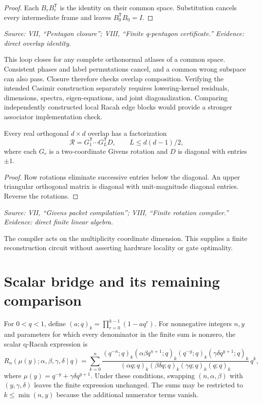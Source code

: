 \begin{proof}
Each $B_rB_r^{\mathsf T}$ is the identity on their common space. Substitution cancels every intermediate frame and leaves $B_0^{\mathsf T}B_0=I$.
\end{proof}

\noindent\emph{Source: VII, ``Pentagon closure''; VIII, ``Finite q-pentagon certificate.'' Evidence: direct overlap identity.}

This loop closes for any complete orthonormal atlases of a common space. Consistent phases and label permutations cancel, and a common wrong subspace can also pass. Closure therefore checks overlap composition. Verifying the intended Casimir construction separately requires lowering-kernel residuals, dimensions, spectra, eigen-equations, and joint diagonalization. Comparing independently constructed local Racah edge blocks would provide a stronger associator implementation check.

\begin{theorem}
Every real orthogonal $d\times d$ overlap has a factorization
\[
\mathcal R=G_1^{\mathsf T}\cdots G_L^{\mathsf T}D,
\qquad L\leq d(d-1)/2,
\]
where each $G_r$ is a two-coordinate Givens rotation and $D$ is diagonal with entries $\pm1$.
\end{theorem}

\begin{proof}
Row rotations eliminate successive entries below the diagonal. An upper triangular orthogonal matrix is diagonal with unit-magnitude diagonal entries. Reverse the rotations.
\end{proof}

\noindent\emph{Source: VII, ``Givens packet compilation''; VIII, ``Finite rotation compiler.'' Evidence: direct finite linear algebra.}

The compiler acts on the multiplicity coordinate dimension. This supplies a finite reconstruction circuit without asserting hardware locality or gate optimality.

\section{Scalar bridge and its remaining comparison}

For $0<q<1$, define $(a;q)_k=\prod_{r=0}^{k-1}(1-aq^r)$. For nonnegative integers $n,y$ and parameters for which every denominator in the finite sum is nonzero, the scalar q-Racah expression is
\[
R_n(\mu(y);\alpha,\beta,\gamma,\delta\mid q)
=\sum_{k=0}^{n}
\frac{(q^{-n};q)_k(\alpha\beta q^{n+1};q)_k
(q^{-y};q)_k(\gamma\delta q^{y+1};q)_k}
{(\alpha q;q)_k(\beta\delta q;q)_k(\gamma q;q)_k(q;q)_k}\,q^k,
\]
where $\mu(y)=q^{-y}+\gamma\delta q^{y+1}$. Under these conditions, swapping $(n,\alpha,\beta)$ with $(y,\gamma,\delta)$ leaves the finite expression unchanged. The sums may be restricted to $k\leq\min(n,y)$ because the additional numerator terms vanish.

